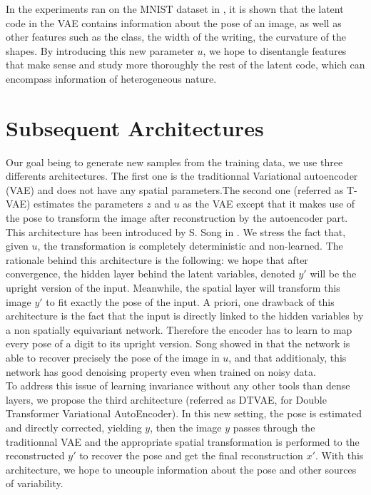 \documentclass[letterpaper, twoside]{article}
\begin{document}
    In the experiments ran on the MNIST dataset \cite{mnistlecun} in \cite{Kingma.aevb}, it is shown that the latent code in the VAE contains information about the pose of an image, as well as other features such as the class, the width of the writing, the curvature of the shapes. By introducing this new parameter $u$, we hope to disentangle features that make sense and study more thoroughly the rest of the latent code, which can encompass information of heterogeneous nature.

\section{Subsequent Architectures}

Our goal being to generate new samples from the training data, we use three differents architectures. The first one is the traditionnal Variational autoencoder (VAE) and does not have any spatial parameters.The second one (referred as T-VAE) estimates the parameters $z$ and $u$ as the VAE except that it makes use of the pose to transform the image after reconstruction by the autoencoder part. This architecture has been introduced by S. Song in \cite{Siyu:vae}. We stress the fact that, given $u$, the transformation is completely deterministic and non-learned. The rationale behind this architecture is the following: we hope that after convergence, the hidden layer behind the latent variables, denoted $y'$ will be the upright version of the input. Meanwhile, the spatial layer will transform this image $y'$ to fit exactly the pose of the input. A priori, one drawback of this architecture is the fact that the input is directly linked to the hidden variables by a non spatially equivariant network. Therefore the encoder has to learn to map every pose of a digit to its upright version. Song showed in \cite{Siyu:vae} that the network is able to recover precisely the pose of the image in $u$, and that additionaly, this network has good denoising property even when trained on noisy data.\\
To address this issue of learning invariance without any other tools than dense layers, we propose the third architecture (referred as DTVAE, for Double Transformer Variational AutoEncoder). In this new setting, the pose is estimated and directly corrected, yielding $y$, then the image $y$ passes through the traditionnal VAE and the appropriate spatial transformation is performed to the reconstructed $y'$ to recover the pose and get the final reconstruction $x'$. With this architecture, we hope to uncouple information about the pose and other sources of variability.\\
\end{document}
